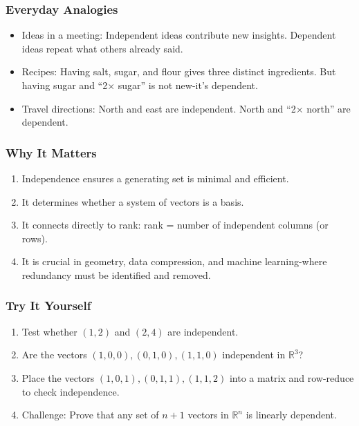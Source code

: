 \documentclass[
  letterpaper,
  DIV=11,
  numbers=noendperiod]{scrreprt}
\providecommand{\tightlist}{%
  \setlength{\itemsep}{0pt}\setlength{\parskip}{0pt}}
\begin{document}
\subsubsection{Everyday Analogies}\label{everyday-analogies-30}

\begin{itemize}
\tightlist
\item
  Ideas in a meeting: Independent ideas contribute new insights.
  Dependent ideas repeat what others already said.
\item
  Recipes: Having salt, sugar, and flour gives three distinct
  ingredients. But having sugar and ``2× sugar'' is not new-it's
  dependent.
\item
  Travel directions: North and east are independent. North and ``2×
  north'' are dependent.
\end{itemize}

\subsubsection{Why It Matters}\label{why-it-matters-30}

\begin{enumerate}
\def\labelenumi{\arabic{enumi}.}
\tightlist
\item
  Independence ensures a generating set is minimal and efficient.
\item
  It determines whether a system of vectors is a basis.
\item
  It connects directly to rank: rank = number of independent columns (or
  rows).
\item
  It is crucial in geometry, data compression, and machine
  learning-where redundancy must be identified and removed.
\end{enumerate}

\subsubsection{Try It Yourself}\label{try-it-yourself-33}

\begin{enumerate}
\def\labelenumi{\arabic{enumi}.}
\tightlist
\item
  Test whether \((1,2)\) and \((2,4)\) are independent.
\item
  Are the vectors \((1,0,0), (0,1,0), (1,1,0)\) independent in
  \(\mathbb{R}^3\)?
\item
  Place the vectors \((1,0,1), (0,1,1), (1,1,2)\) into a matrix and
  row-reduce to check independence.
\item
  Challenge: Prove that any set of \(n+1\) vectors in \(\mathbb{R}^n\)
  is linearly dependent.
\end{enumerate}
\end{document}
